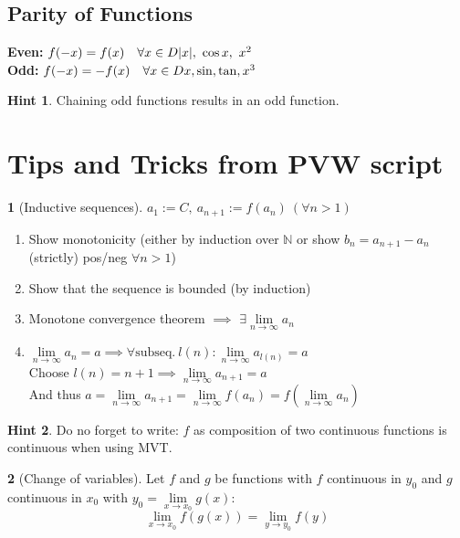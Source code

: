 \documentclass[a4paper, 10pt]{article}
\theoremstyle{definition}
\newtheorem*{note_wrapper}{Hint}
\theoremstyle{ex}
\newtheorem*{exercise}{}
\theoremstyle{named}
\newenvironment{note}%
    {\begin{mdframed}[style=trick]\begin{note_wrapper}}%
    {\end{note_wrapper}\end{mdframed}}
\newcommand{\N}{\mathbb{N}}
\begin{document}
\subsection*{Parity of Functions}
\textbf{Even:} $f(-x) = f(x) \quad \forall x \in D \hfill |x|, \ \cos x, \ x^2$ \\
\textbf{Odd:} $f(-x) = -f(x) \quad \forall x \in D \hfill x, \sin, \tan, x^3$

\begin{note}
    Chaining odd functions results in an odd function.
\end{note}

\section*{Tips and Tricks from PVW script}
\begin{exercise}[Inductive sequences]
    $a_1 := C, \ a_{n+1} := f(a_n) \ (\forall n > 1)$
    \begin{enumerate}
        \item Show monotonicity (either by induction over $\N$ or show $b_n = a_{n+1} - a_n$ (strictly) pos/neg $\forall n > 1$)
        \item Show that the sequence is bounded (by induction)
        \item Monotone convergence theorem $\implies$ $\exists \lim\limits_{n\to\infty} a_n$
        \item $\lim\limits_{n\to\infty} a_n = a \implies \forall\text{subseq.} \ l(n) : \lim\limits_{n\to\infty} a_{l(n)} = a$ \\
        Choose $l(n) = n + 1 \implies \lim\limits_{n\to\infty} a_{n+1} = a$ \\
        And thus $a = \lim\limits_{n\to\infty} a_{n+1} = \lim\limits_{n\to\infty} f(a_n) = f(\lim\limits_{n\to\infty} a_n)$
    \end{enumerate}
\end{exercise}

\begin{note}
    Do no forget to write: $f$ as composition of two continuous functions is continuous when using MVT.
\end{note}

\begin{exercise}[Change of variables]
    Let $f$ and $g$ be functions with $f$ continuous in $y_0$ and $g$ continuous in $x_0$ with $y_0 = \lim\limits_{x \to x_0} g(x)$:
    $$\lim_{x \to x_0} f(g(x)) = \lim_{y \to y_0} f(y)$$
\end{exercise}
\end{document}
